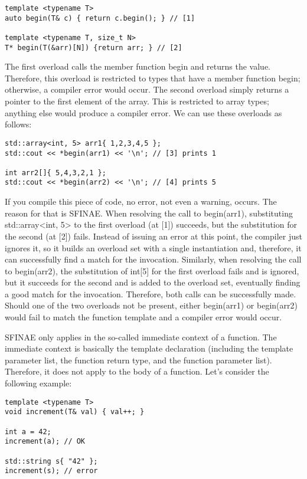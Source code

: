 \begin{lstlisting}[style=styleCXX]
template <typename T>
auto begin(T& c) { return c.begin(); } // [1]

template <typename T, size_t N>
T* begin(T(&arr)[N]) {return arr; } // [2]
\end{lstlisting}

The first overload calls the member function begin and returns the value. Therefore, this overload is restricted to types that have a member function begin; otherwise, a compiler error would occur. The second overload simply returns a pointer to the first element of the array. This is restricted to array types; anything else would produce a compiler error.
We can use these overloads as follows:

\begin{lstlisting}[style=styleCXX]
std::array<int, 5> arr1{ 1,2,3,4,5 };
std::cout << *begin(arr1) << '\n'; // [3] prints 1

int arr2[]{ 5,4,3,2,1 };
std::cout << *begin(arr2) << '\n'; // [4] prints 5
\end{lstlisting}

If you compile this piece of code, no error, not even a warning, occurs. The reason for that is SFINAE. When resolving the call to begin(arr1), substituting std::array<int, 5> to the first overload (at [1]) succeeds, but the substitution for the second (at [2]) fails. Instead of issuing an error at this point, the compiler just ignores it, so it builds an overload set with a single instantiation and, therefore, it can successfully find a match for the invocation. Similarly, when resolving the call to begin(arr2), the substitution of int[5] for the first overload fails and is ignored, but it succeeds for the second and is added to the overload set, eventually finding a good match for the invocation. Therefore, both calls can be successfully made. Should one of the two overloads not be present, either begin(arr1) or begin(arr2) would fail to match the function template and a compiler error would occur.

SFINAE only applies in the so-called immediate context of a function. The immediate context is basically the template declaration (including the template parameter list, the function return type, and the function parameter list). Therefore, it does not apply to the body of a function. Let’s consider the following example:

\begin{lstlisting}[style=styleCXX]
template <typename T>
void increment(T& val) { val++; }

int a = 42;
increment(a); // OK

std::string s{ "42" };
increment(s); // error
\end{lstlisting}

